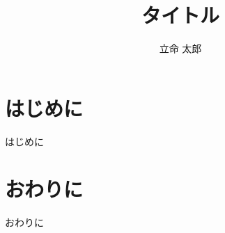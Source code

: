 ﻿\documentclass[twocolumn,a4paper,9pt]{jsarticle}
\title{タイトル}
\author{立命 太郎}
\begin{document}
\setlength{\baselineskip}{14.2pt}
\papertitle


\section{はじめに}
はじめに
\cite{en}
\cite{jp}

\section{おわりに}
おわりに\

{\small


}
\end{document}

